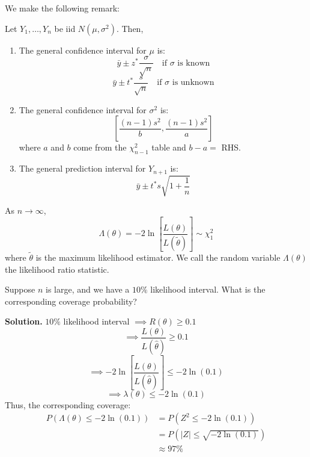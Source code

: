 We make the following remark:
\begin{Remark}{}{} Let $ Y_1,\ldots ,Y_{n} $ be iid $ N(\mu,\sigma^2) $. Then,
    \begin{enumerate}[label=(\roman*)]
        \item The general confidence interval for $ \mu $ is:
              \[ \bar{y}\pm z^* \frac{\sigma}{\sqrt{n}} \quad\text{if $\sigma$ is known} \]
              \[ \bar{y}\pm t^* \frac{s}{\sqrt{n}} \quad\text{if $\sigma$ is unknown} \]
        \item The general confidence interval for $ \sigma^2 $ is:
              \[ \left[ \frac{(n-1)s^2}{b} ,\frac{(n-1)s^2}{a} \right] \]
              where $ a $ and $ b $ come from the $ \chi^2_{n-1} $ table
              and $ b-a= $ RHS\@.
        \item The general prediction interval for $ Y_{n+1} $ is:
              \[ \bar{y}\pm t^* s \sqrt{1+\frac{1}{n}} \]
    \end{enumerate}
\end{Remark}


\begin{Theorem}{}{}
    As $ n\to \infty $,
    \[ \Lambda(\theta)=-2\ln\left[  \frac{L(\theta)}{L(\tilde{\theta})} \right] \sim \chi^2_1  \]
    where $ \tilde{\theta} $ is the maximum likelihood estimator. We call the random
    variable $ \Lambda(\theta) $ the likelihood ratio statistic.
\end{Theorem}



\begin{Example}{}{}
    Suppose $ n $ is large, and we have a $ 10\% $ likelihood interval. What is the corresponding
    coverage probability?

    \textbf{Solution.} $ 10\% $ likelihood interval $ \implies R(\theta)\geqslant 0.1 $
    \[ \implies \frac{L(\theta)}{L(\hat{\theta})}\geqslant 0.1  \]
    \[ \implies -2\ln\left[  \frac{L(\theta)}{L(\hat{\theta})} \right]\leqslant -2\ln(0.1)  \]
    \[ \implies \lambda(\theta)\leqslant -2\ln(0.1) \]
    Thus, the corresponding coverage:
    \begin{align*}
        P(\Lambda(\theta)\leqslant -2\ln(0.1))
         & = P(Z^2\leqslant -2\ln(0.1))        \\
         & = P(|Z|\leqslant \sqrt{-2\ln(0.1)}) \\
         & \approx 97\%
    \end{align*}
\end{Example}

